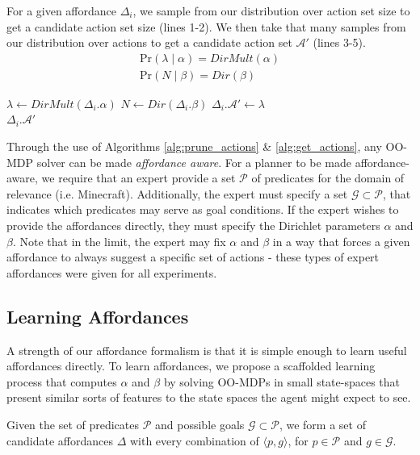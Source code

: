 \documentclass[conference]{IEEEtran}
\begin{document}
For a given affordance $\Delta_i$, we sample from our distribution over action set size to get a candidate action set size (lines 1-2). We then
take that many samples from our distribution over actions to get a candidate action set $\mathcal{A}'$ (lines 3-5).
\begin{align}
\text{Pr}(\lambda \mid \alpha) = DirMult(\alpha) \\
\text{Pr}(N \mid \beta) = Dir(\beta)
\end{align}

\begin{algorithm}
  \caption{$\Delta_i.getActions(s)$}
  \begin{algorithmic}[1]
    \State $\lambda \leftarrow DirMult(\Delta_i.\alpha)$
    \State $N \leftarrow Dir(\Delta_i.\beta)$
    \State $\Delta_i.\mathcal{A}' \leftarrow \lambda$
    \EndFor \\
    \Return $\Delta_i.\mathcal{A}'$
  \end{algorithmic}
  \label{alg:get_actions}
\end{algorithm}

Through the use of Algorithms \ref{alg:prune_actions} \& \ref{alg:get_actions}, any OO-MDP solver can be made
{\it affordance aware}. For a planner to be made affordance-aware, we require that an expert provide a set $\mathcal{P}$ of predicates
for the domain of relevance (i.e. Minecraft). Additionally, the expert must specify a set
$\mathcal{G} \subset \mathcal{P}$, that indicates which predicates may serve as goal conditions. If the expert wishes
to provide the affordances directly, they must specify the Dirichlet parameters $\alpha$ and $\beta$. Note that
in the limit, the expert may fix $\alpha$ and $\beta$ in a way that forces a given
affordance to always suggest a specific set of actions - these types of expert affordances were given for all
experiments.

\subsection{Learning Affordances}

A strength of our affordance formalism is that it is simple enough to learn useful affordances directly.
To learn affordances, we propose a scaffolded learning process that computes $\alpha$ and $\beta$ by solving OO-MDPs in small state-spaces that present similar sorts of features to the state spaces the agent might expect to see.

Given the set of predicates $\mathcal{P}$ and possible goals $\mathcal{G} \subset \mathcal{P}$, we form a set of candidate affordances $\Delta$ with every combination of $\langle p, g \rangle$, for $p \in \mathcal{P}$ and $g \in \mathcal{G}$.
\end{document}
